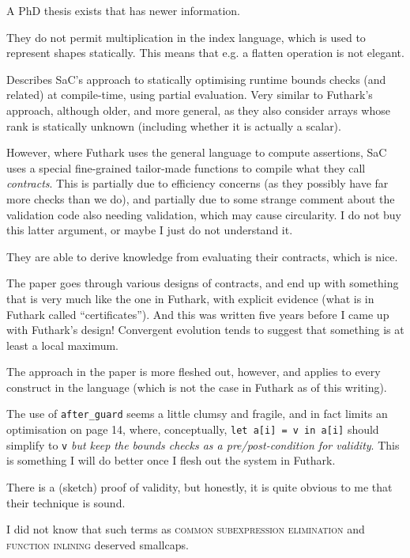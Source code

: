 \documentclass[a4paper, oneside, final]{memoir}
\begin{document}
A PhD thesis exists that has newer information.

They do not permit multiplication in the index language, which is used
to represent shapes statically.  This means that e.g. a flatten
operation is not elegant.

\begin{quote}
\end{quote}

Describes SaC's approach to statically optimising runtime bounds
checks (and related) at compile-time, using partial evaluation.  Very
similar to Futhark's approach, although older, and more general, as
they also consider arrays whose rank is statically unknown (including
whether it is actually a scalar).

However, where Futhark uses the general language to compute
assertions, SaC uses a special fine-grained tailor-made functions to
compile what they call \textit{contracts}.  This is partially due to
efficiency concerns (as they possibly have far more checks than we
do), and partially due to some strange comment about the validation
code also needing validation, which may cause circularity.  I do not
buy this latter argument, or maybe I just do not understand it.

They are able to derive knowledge from evaluating their contracts,
which is nice.

The paper goes through various designs of contracts, and end up with
something that is very much like the one in Futhark, with explicit
evidence (what is in Futhark called ``certificates'').  And this was
written five years before I came up with Futhark's design!  Convergent
evolution tends to suggest that something is at least a local maximum.

The approach in the paper is more fleshed out, however, and applies to
every construct in the language (which is not the case in Futhark as
of this writing).

The use of \texttt{after\_guard} seems a little clumsy and fragile,
and in fact limits an optimisation on page 14, where, conceptually,
\texttt{let a[i] = v in a[i]} should simplify to \texttt{v}
\textit{but keep the bounds checks as a pre/post-condition for
  validity}.  This is something I will do better once I flesh out the
system in Futhark.

There is a (sketch) proof of validity, but honestly, it is quite
obvious to me that their technique is sound.

I did not know that such terms as \textsc{common subexpression
  elimination} and \textsc{function inlining} deserved smallcaps.
\end{document}
